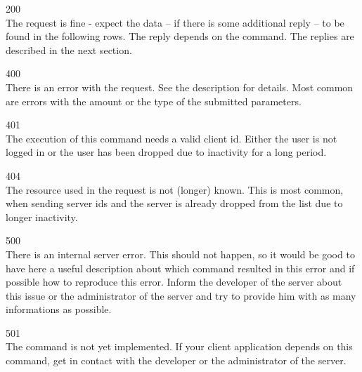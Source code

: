 \documentclass[a4paper,10pt]{article}
\begin{document}
\begin{description}

\item 200 \\
The request is fine - expect the data -- if there is some additional reply --
to be found in the following rows. The reply depends on the command. The
replies are described in the next section.

\item 400 \\
There is an error with the request. See the description for details. Most
common are errors with the amount or the type of the submitted parameters.

\item 401 \\
The execution of this command needs a valid client id. Either the user is not
logged in or the user has been dropped due to inactivity for a long period.

\item 404 \\
The resource used in the request is not (longer) known. This is most common,
when sending server ids and the server is already dropped from the list due to
longer inactivity.

\item 500 \\
There is an internal server error. This should not happen, so it would be good
to have here a useful description about which command resulted in this error
and if possible how to reproduce this error. Inform the developer of the
server about this issue or the administrator of the server and try to provide
him with as many informations as possible.

\item 501 \\
The command is not yet implemented. If your client application depends on this
command, get in contact with the developer or the administrator of the server.

\end{description}


\end{document}
